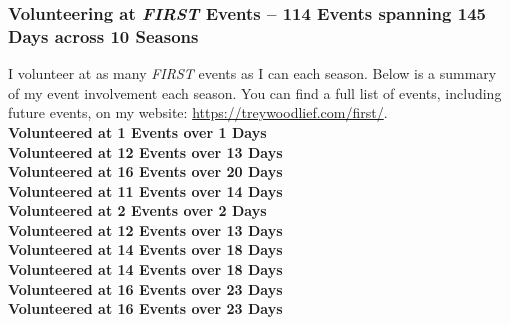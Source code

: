 \subsubsection*{Volunteering at \textit{FIRST} Events -- 114 Events spanning 145 Days across 10 Seasons}
I volunteer at as many \textit{FIRST} events as I can each season. Below is a summary of my event involvement each season.
You can find a full list of events, including future events, on my website: \url{https://treywoodlief.com/first/}.\\ 
 \textbf{Volunteered at 1 Events over 1 Days}\\ 
 \textbf{Volunteered at 12 Events over 13 Days}\\ 
 \textbf{Volunteered at 16 Events over 20 Days}\\ 
 \textbf{Volunteered at 11 Events over 14 Days}\\ 
 \textbf{Volunteered at 2 Events over 2 Days}\\ 
 \textbf{Volunteered at 12 Events over 13 Days}\\ 
 \textbf{Volunteered at 14 Events over 18 Days}\\ 
 \textbf{Volunteered at 14 Events over 18 Days}\\ 
 \textbf{Volunteered at 16 Events over 23 Days}\\ 
 \textbf{Volunteered at 16 Events over 23 Days}\\ 
